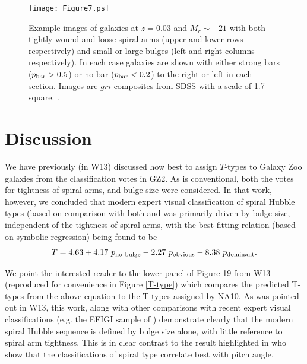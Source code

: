 \documentclass[usenatbib]{mn2e}
\newcommand{\be}{\begin{equation}}
\newcommand{\ee}{\end{equation}}
\begin{document}
\begin{figure}
\center
\texttt{[image: Figure7.ps]}
\caption{Example images of galaxies at $z=0.03$ and $M_r\sim -21$ with both tightly wound and loose spiral arms (upper and lower rows respectively) and small or large bulges (left and right columns respectively). In each case galaxies are shown with either strong bars ($p_{\rm bar}>0.5$) or no bar ($p_{\rm bar} < 0.2$) to the right or left in each section. Images are $gri$ composites from SDSS with a scale of 1.7\arcmin~ square.  \label{windingexample}.}
\end{figure}
 
\section{Discussion} \label{discussion}
 
 We have previously (in W13) discussed how best to assign $T$-types to Galaxy Zoo galaxies from the classification votes in GZ2. As is conventional, both the votes for tightness of spiral arms, and bulge size were considered. In that work, however, we concluded that modern expert visual classification of spiral Hubble types (based on comparison with both \citet[hereafter NA10]{Nair2010a} and \citet{EFIGI} was primarily driven by bulge size, independent of the tightness of spiral arms, with the best fitting relation (based on symbolic regression) being found to be
 \be
 T = 4.63 + 4.17~p_{\rm no~bulge} - 2.27~p_{\rm obvious} - 8.38~p_{\rm dominant}. 
 \ee 
 
We point the interested reader to the lower panel of Figure 19 from W13 (reproduced for convenience in Figure \ref{T-type}) which compares the predicted T-types from the above equation to the T-types assigned by NA10. As was pointed out in W13, this work, along with other comparisons with recent expert visual classifications (e.g. the EFIGI sample of \citealt{EFIGI}) demonstrate clearly that the modern spiral Hubble sequence is defined by bulge size alone, with little reference to spiral arm tightness. This is in clear contrast to the result highlighted in \citet{kennicutt1981} who show that the \citet{sandagetammann1981} classifications of spiral type correlate best with pitch angle. 
\end{document}
